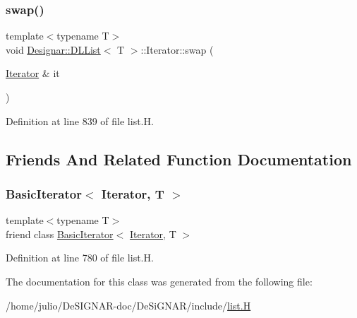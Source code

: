 \mbox{\label{class_designar_1_1_d_l_list_1_1_iterator_afb6abdec64f67b81813441a4c7d133d1}} 
\subsubsection{\texorpdfstring{swap()}{swap()}}
{\footnotesize\ttfamily template$<$typename T$>$ \\
void \hyperlink{class_designar_1_1_d_l_list}{Designar\+::\+D\+L\+List}$<$ T $>$\+::Iterator\+::swap (\begin{DoxyParamCaption}\item[{\hyperlink{class_designar_1_1_d_l_list_1_1_iterator}{Iterator} \&}]{it }\end{DoxyParamCaption})\hspace{0.3cm}{\ttfamily [inline]}}



Definition at line 839 of file list.\+H.



\subsection{Friends And Related Function Documentation}
\mbox{\label{class_designar_1_1_d_l_list_1_1_iterator_ae3421d6be56b523bf3c41ceb29f3e5d7}} 
\subsubsection{\texorpdfstring{Basic\+Iterator$<$ Iterator, T $>$}{BasicIterator< Iterator, T >}}
{\footnotesize\ttfamily template$<$typename T$>$ \\
friend class \hyperlink{class_designar_1_1_basic_iterator}{Basic\+Iterator}$<$ \hyperlink{class_designar_1_1_d_l_list_1_1_iterator}{Iterator}, T $>$\hspace{0.3cm}{\ttfamily [friend]}}



Definition at line 780 of file list.\+H.



The documentation for this class was generated from the following file\+:\begin{DoxyCompactItemize}
\item 
/home/julio/\+De\+S\+I\+G\+N\+A\+R-\/doc/\+De\+Si\+G\+N\+A\+R/include/\hyperlink{list_8_h}{list.\+H}\end{DoxyCompactItemize}

